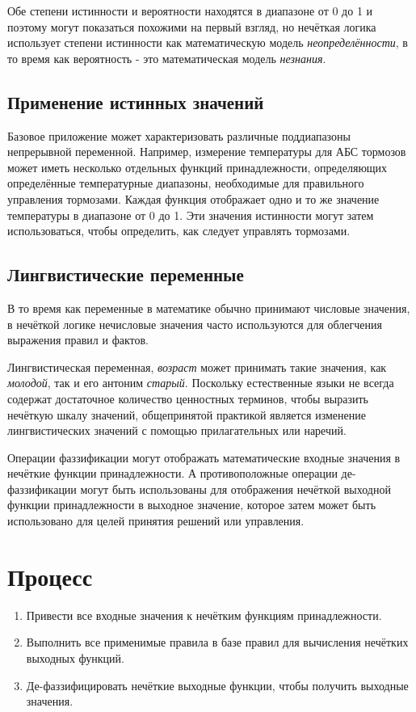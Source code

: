 \documentclass[a4paper,12pt]{report}
\begin{document}
Обе степени истинности и вероятности находятся в диапазоне от 0 до 1 и поэтому могут показаться похожими на первый взгляд, но нечёткая логика использует степени истинности как математическую модель \textit{неопределённости}, в то время как вероятность - это математическая модель \textit{незнания}.

\subsection{Применение истинных значений}
Базовое приложение может характеризовать различные поддиапазоны непрерывной переменной. Например, измерение температуры для АБС тормозов может иметь несколько отдельных функций принадлежности, определяющих определённые температурные диапазоны, необходимые для правильного управления тормозами. Каждая функция отображает одно и то же значение температуры в диапазоне от 0 до 1. Эти значения истинности могут затем использоваться, чтобы определить, как следует управлять тормозами.

\subsection{Лингвистические переменные}
В то время как переменные в математике обычно принимают числовые значения, в нечёткой логике нечисловые значения часто используются для облегчения выражения правил и фактов.

Лингвистическая переменная, \textit{возраст} может принимать такие значения, как \textit{молодой}, так и его антоним \textit{старый}. Поскольку естественные языки не всегда содержат достаточное количество ценностных терминов, чтобы выразить нечёткую шкалу значений, общепринятой практикой является изменение лингвистических значений с помощью прилагательных или наречий.

Операции фаззификации могут отображать математические входные значения в нечёткие функции принадлежности. А противоположные операции де-фаззификации могут быть использованы для отображения нечёткой выходной функции принадлежности в  выходное значение, которое затем может быть использовано для целей принятия решений или управления.

\section{Процесс}
\begin{enumerate}
	\item Привести все входные значения к нечётким функциям принадлежности.
	\item Выполнить все применимые правила в базе правил для вычисления нечётких выходных функций. 
	\item Де-фаззифицировать нечёткие выходные функции, чтобы получить  выходные значения.
\end{enumerate}
\end{document}
